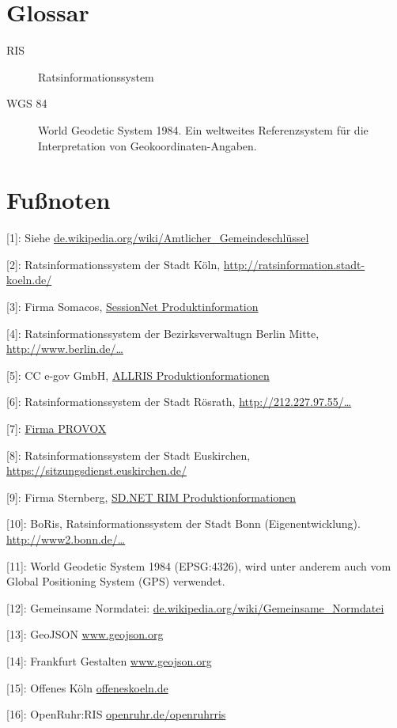 \documentclass[,a4paper]{article}
\begin{document}
\section{Glossar}

\begin{description}
\item[RIS]
Ratsinformationssystem
\item[WGS 84]
World Geodetic System 1984. Ein weltweites Referenzsystem für die
Interpretation von Geokoordinaten-Angaben.
\end{description}

\section{Fußnoten}

{[}1{]}: Siehe
\href{http://de.wikipedia.org/wiki/Amtlicher\_Gemeindeschl\%C3\%BCssel}{de.wikipedia.org/wiki/Amtlicher\_Gemeindeschlüssel}

{[}2{]}: Ratsinformationssystem der Stadt Köln,
\href{http://ratsinformation.stadt-koeln.de/}{http://ratsinformation.stadt-koeln.de/}

{[}3{]}: Firma Somacos,
\href{http://www.somacos.de/de/sitzungsdienst/ratsinfo.html}{SessionNet
Produktinformation}

{[}4{]}: Ratsinformationssystem der Bezirksverwaltugn Berlin Mitte,
\href{http://www.berlin.de/ba-mitte/bvv-online/allris.net.asp}{http://www.berlin.de/\ldots{}}

{[}5{]}: CC e-gov GmbH, \href{http://www.cc-egov.de/allris.htm}{ALLRIS
Produktionformationen}

{[}6{]}: Ratsinformationssystem der Stadt Rösrath,
\href{http://212.227.97.55/ratsinfo/roesrath}{http://212.227.97.55/\ldots{}}

{[}7{]}: \href{http://www.provox.de/}{Firma PROVOX}

{[}8{]}: Ratsinformationssystem der Stadt Euskirchen,
\href{https://sitzungsdienst.euskirchen.de/}{https://sitzungsdienst.euskirchen.de/}

{[}9{]}: Firma Sternberg,
\href{http://www.sitzungsdienst.net/produkte/ratsinformationsmanagement}{SD.NET
RIM Produktionformationen}

{[}10{]}: BoRis, Ratsinformationssystem der Stadt Bonn
(Eigenentwicklung).
\href{http://www2.bonn.de/bo\_ris/ris\_sql/agm\_index.asp}{http://www2.bonn.de/\ldots{}}

{[}11{]}: World Geodetic System 1984 (EPSG:4326), wird unter anderem
auch vom Global Positioning System (GPS) verwendet.

{[}12{]}: Gemeinsame Normdatei:
\href{http://de.wikipedia.org/wiki/Gemeinsame\_Normdatei}{de.wikipedia.org/wiki/Gemeinsame\_Normdatei}

{[}13{]}: GeoJSON \href{http://www.geojson.org/}{www.geojson.org}

{[}14{]}: Frankfurt Gestalten
\href{http://www.geojson.org/}{www.geojson.org}

{[}15{]}: Offenes Köln \href{http://offeneskoeln.de/}{offeneskoeln.de}

{[}16{]}: OpenRuhr:RIS
\href{http://openruhr.de/openruhrris/}{openruhr.de/openruhrris}
\end{document}
